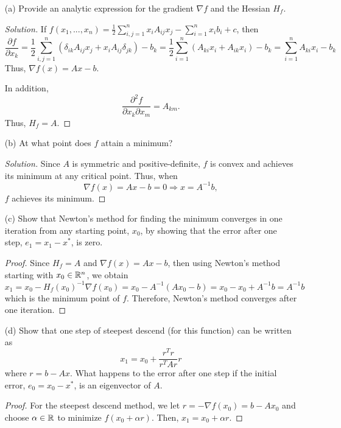 \documentclass[10pt]{article}
\begin{document}
\begin{itemize}
\item[(a)] Provide an analytic expression for the gradient $ \nabla f $ and the Hessian $ H_f $.

\begin{proof}[Solution]
If $ f(x_1, ... , x_n) = \frac{1}{2} \sum_{i,j = 1}^n x_i A_{ij} x_j - \sum_{i = 1}^n x_i b_i + c $, then $$
\frac{\partial f}{\partial x_k} = \frac{1}{2} \sum_{i,j = 1}^n ( \delta_{ik} A_{ij} x_j + x_i A_{ij} \delta_{jk} ) - b_k = \frac{1}{2} \sum_{i = 1}^n ( A_{ki} x_i + A_{ik} x_i ) - b_k = \sum_{i = 1}^n A_{ki} x_i - b_k
$$ Thus, $ \nabla f(x) = Ax - b $.

In addition, $$
\frac{\partial^2 f}{\partial x_k \partial x_m} = A_{km}.
$$ Thus, $ H_f = A $.
\end{proof}

\item[(b)] At what point does $f$ attain a minimum?

\begin{proof}[Solution]
Since $A$ is symmetric and positive-definite, $f$ is convex and achieves its minimum at any critical point. Thus, when $$
\nabla f(x) = Ax - b = 0 \Rightarrow x = A^{-1} b,
$$ $f$ achieves its minimum.
\end{proof}

\item[(c)] Show that Newton's method for finding the minimum converges in one iteration from any starting point, $x_0$, by showing that the error after one step, $ e_1 = x_1 - x^* $, is zero.

\begin{proof}
Since $ H_f = A $ and $ \nabla f(x) = Ax - b $, then using Newton's method starting with $ x_0 \in \mathbb{R}^n $, we obtain $$
x_1 = x_0 - H_f(x_0)^{-1} \nabla f(x_0) = x_0 - A^{-1}( Ax_0 - b ) = x_0 - x_0 + A^{-1} b = A^{-1} b
$$ which is the minimum point of $f$. Therefore, Newton's method converges after one iteration.
\end{proof}

\item[(d)] Show that one step of steepest descend (for this function) can be written as $$
x_1 = x_0 + \frac{r^T r}{r^T A r} r
$$ where $ r = b - Ax $. What happens to the error after one step if the initial error, $ e_0 = x_0 - x^* $, is an eigenvector of $A$.

\begin{proof}
For the steepest descend method, we let $ r = -\nabla f(x_0) = b - Ax_0 $ and choose $ \alpha \in \mathbb{R} $ to minimize $ f(x_0 + \alpha r ) $. Then, $ x_1 = x_0 + \alpha r $.


\end{proof}
\end{itemize}
\end{document}
